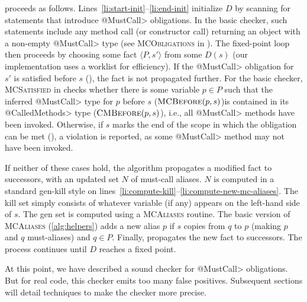  proceeds as follows.
Lines~\ref{li:start-init}--\ref{li:end-init} initialize $D$ by scanning for
statements that introduce \<@MustCall> obligations.  In the basic checker, such
statements include any method call (or constructor call) returning an object
with a non-empty \<@MustCall> type (see \textsc{MCObligations} in
).  The fixed-point loop then proceeds by choosing some fact
$\langle P, s' \rangle$ from some $D(s)$ (our implementation uses a worklist for
efficiency).  If the \<@MustCall> obligation for $s'$ is satisfied before $s$
(), the fact is not propagated further.
For the basic checker, \textsc{MCSatisfied} in  checks whether
there is some variable $p \in P$ such that the inferred \<@MustCall> type for
$p$ before $s$ ($\textsc{MCBefore}(p,s)$)is contained in its \<@CalledMethods>
type ($\textsc{CMBefore}(p,s)$), i.e., all
\<@MustCall> methods have been invoked.  Otherwise, if $s$ marks the end of the
scope in which the obligation can be met (), a violation is
reported, as some \<@MustCall> method may not have been invoked.

If neither of these cases hold, the algorithm propagates a modified fact to
successors, with an updated set $N$ of must-call aliases.  $N$ is computed in a
standard gen-kill style on
lines~\ref{li:compute-kill}--\ref{li:compute-new-mc-aliases}.  The kill set
simply consists of whatever variable (if any) appears on the left-hand side of
$s$.  The gen set is computed using a \textsc{MCAliases} routine.  The basic
version of \textsc{MCAliases} (\cref{alg:helpers}) adds a new alias $p$
if $s$ copies from $q$ to $p$ (making $p$ and $q$ must-aliases) and $q \in P$.
Finally,  propagates the new fact to successors.  The
process continues until $D$ reaches a fixed point.  

At this point, we have described a sound checker for \<@MustCall> obligations.
But for real code, this checker emits too many false positives.  Subsequent
sections will detail techniques to make the checker more precise.


